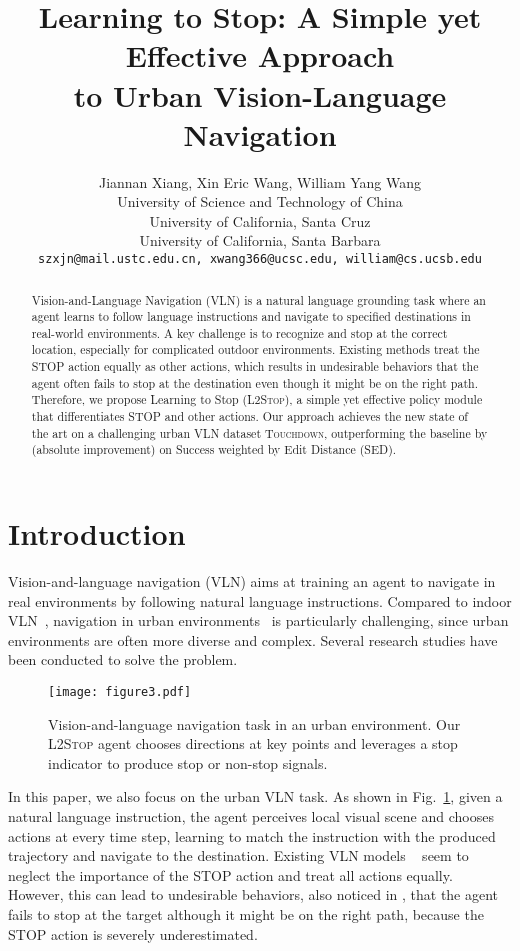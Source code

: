 \documentclass[11pt,a4paper]{article}
\title{Learning to Stop: A Simple yet Effective Approach\\ to Urban Vision-Language Navigation}
\author{Jiannan Xiang, Xin Eric Wang, William Yang Wang \\
  University of Science and Technology of China \\
  University of California, Santa Cruz \\
  University of California, Santa Barbara\\
  \texttt{\small szxjn@mail.ustc.edu.cn, xwang366@ucsc.edu, william@cs.ucsb.edu}
}
\date{}
\begin{document}
\maketitle
\begin{abstract}
Vision-and-Language Navigation (VLN) is a natural language grounding task where an agent learns to follow language instructions and navigate to specified destinations in real-world environments. A key challenge is to recognize and stop at the correct location, especially for complicated outdoor environments. Existing methods treat the STOP action equally as other actions, which results in undesirable behaviors that the agent often fails to stop at the destination even though it might be on the right path.
Therefore, we propose Learning to Stop (\textsc{L2Stop}), a simple yet effective policy module that differentiates STOP and other actions.
Our approach achieves the new state of the art on a challenging urban VLN dataset \textsc{Touchdown}, outperforming the baseline by  (absolute improvement) on Success weighted by Edit Distance (SED).
\end{abstract}

\section{Introduction}
Vision-and-language navigation (VLN) aims at training an agent to navigate in real environments by following natural language instructions. 
Compared to indoor VLN~\citep{anderson2018vision}, navigation in urban environments~\citep{chen2019touchdown} is particularly challenging, since urban environments are often more diverse and complex. Several research studies \cite{mirowski2018learning,li2019cross,bruce2018learning} have been conducted to solve the problem.
\begin{figure}
\begin{center}
\texttt{[image: figure3.pdf]}
\end{center}
   \caption{Vision-and-language navigation task in an urban environment. Our \textsc{L2Stop} agent chooses directions at key points and leverages a stop indicator to produce stop or non-stop signals.}
\label{fig:figure1}
\end{figure} 
In this paper, we also focus on the urban VLN task. As shown in Fig.~\ref{fig:figure1}, given a natural language instruction, the agent perceives local visual scene and chooses actions at every time step, learning to match the instruction with the produced trajectory and navigate to the destination. Existing VLN models ~\citep{wang2019reinforced,tan2019learning,ke2019tactical,ma2019regretful,ma2019self, fried2018speaker,wang2018look} seem to neglect the importance of the STOP action and treat all actions equally. 
However, this can lead to undesirable behaviors, also noticed in \citet{cirik2018following, blukis2018mapping}, that the agent fails to stop at the target although it might be on the right path, because the STOP action is severely underestimated.
\end{document}
